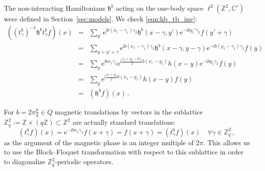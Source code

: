 \documentclass[a4paper]{article}
\newcommand{\e}{\mathrm{e}}
\renewcommand{\i}{\mathrm{i}}
\newcommand{\fd}{r}
\newcommand{\Z}{\mathbb{Z}}
\newcommand{\C}{\mathbb{C}}
\theoremstyle{plain}
\theoremstyle{definition}
\theoremstyle{remark}
\renewcommand{\(}{\left(}
\renewcommand{\)}{\right)}
\begin{document}
The non-interacting  Hamiltonians $\mathfrak{h}^b$ acting on the one-body space $ \ell^2(\Z^2,\C^\fd)$ were defined in Section~\ref{sec:models}. 
We check \eqref{eqn:hb_tb_inv}:
\begin{eqnarray*}
    ((t^b_\gamma)^{-1}\mathfrak{h}^bt^b_\gamma  f)(x) &=& \sum_{y'} \e^{\i b (x_1-\gamma_1)\gamma_2}\mathfrak{h}^b(x-\gamma,y') \e^{-\i b y_1'\gamma_2} f(y'+\gamma)\\
    &=& \sum_{y=y'+\gamma} \e^{\i b (x_1-\gamma_1)\gamma_2} \mathfrak{h}^b(x-\gamma,y- \gamma) \e^{-\i b (y_1-\gamma_1)\gamma_2} f(y )\\
    &=&\sum_y \e^{\i b x_1\gamma_2} \mathrm{e}^{ \mathrm{i}\frac{x_2+y_2-2\gamma_2}{2} b (x_1-y_1)}  h(x-y) \e^{-\i b  y_1 \gamma_2} f(y )\\
    &=&\sum_y   \mathrm{e}^{ \mathrm{i}\frac{x_2+y_2}{2} b (x_1-y_1)}  h(x-y)   f(y )\\
    &=& (\mathfrak{h}^bf)(x)\,.
\end{eqnarray*}

 



For $b=2\pi \frac{p}{q} \in Q$ 
magnetic translations by vectors in    the sublattice $\Z^2_q:= \Z\times (q \Z)\subset \Z^2$ are actually   standard translations:
\[
(t^b_\gamma f)(x)=  \e^{-\i b x_1\gamma_2} f(x+\gamma) = f(x+\gamma) = (t^0_\gamma f)(x) \quad \forall\gamma\in \Z^2_q\,,
\]
as the argument of the magnetic phase is an integer multiple of $2\pi$. This allows us to use the Bloch--Floquet transformation with respect to this sublattice in order to diagonalize $\Z^2_q$-periodic operators.
\end{document}
